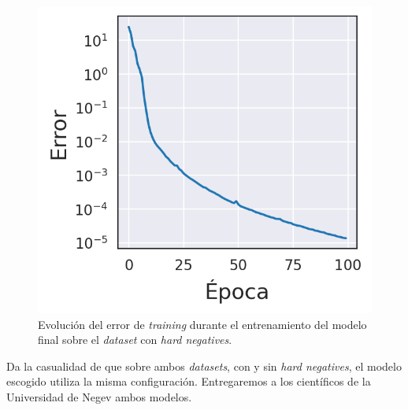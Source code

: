 \begin{figure}[H]
\centering
    \includegraphics[scale=0.67]{imagenes/image_classification/synthetic_dataset/loss_final_model.png}
    \caption{Evolución del error de \textit{training} durante el entrenamiento del modelo final sobre el \textit{dataset} con \textit{hard negatives}.}
\end{figure}

Da la casualidad de que sobre ambos \textit{datasets}, con y sin \textit{hard negatives}, el modelo escogido utiliza la misma configuración.  Entregaremos a los científicos de la Universidad de Negev ambos modelos.